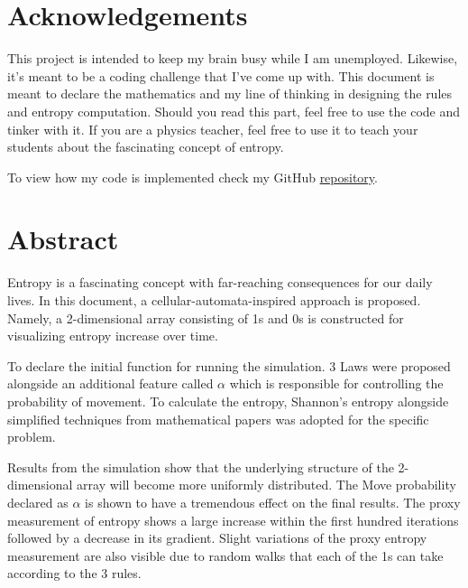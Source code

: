 \documentclass[12pt]{report}
\begin{document}


\chapter*{Acknowledgements}
This project is intended to keep my brain busy while I am unemployed. Likewise, it's meant to be a coding challenge that I've come up with. This document is meant to declare the mathematics and my line of thinking in designing the rules and entropy computation. Should you read this part, feel free to use the code and tinker with it. If you are a physics teacher, feel free to use it to teach your students about the fascinating concept of entropy.   \par

\vspace{0.3cm}
To view how my code is implemented check my GitHub \href{https://github.com/ShiroHusin/Entropy_Simulation}{repository}.


\chapter*{Abstract}
Entropy is a fascinating concept with far-reaching consequences for our daily lives. In this document, a cellular-automata-inspired approach is proposed. Namely, a 2-dimensional array consisting of 1s and 0s is constructed for visualizing  entropy increase over time. \par

\vspace{0.3cm}
\noindent
To declare the initial function for running the simulation. 3 Laws were proposed alongside an additional feature called $\alpha$ which is responsible for controlling the probability of movement. To calculate the entropy, Shannon's entropy alongside simplified techniques from mathematical papers was adopted for the specific problem.  \par

\vspace{0.3cm}
\noindent
Results from the simulation show that the underlying structure of the 2-dimensional array will become more uniformly distributed. The Move probability declared as $\alpha$ is shown to have a tremendous effect on the final results. The proxy measurement of entropy shows a large increase within the first hundred iterations followed by a decrease in its gradient. Slight variations of the proxy entropy measurement are also visible due to random walks that each of the 1s can take according to the 3 rules.     \par



\tableofcontents

\pagebreak



\pagebreak


\pagebreak


\pagebreak


\pagebreak
 

\end{document}
